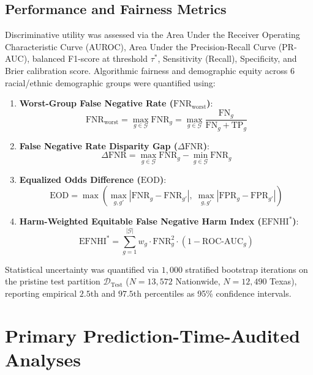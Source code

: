 \documentclass[10pt,journal]{IEEEtran}
\begin{document}
\subsection{Performance and Fairness Metrics}
Discriminative utility was assessed via the Area Under the Receiver Operating Characteristic Curve (AUROC), Area Under the Precision-Recall Curve (PR-AUC), balanced F1-score at threshold $\tau^*$, Sensitivity (Recall), Specificity, and Brier calibration score. Algorithmic fairness and demographic equity across 6 racial/ethnic demographic groups were quantified using:
\begin{enumerate}
    \item \textbf{Worst-Group False Negative Rate ($\text{FNR}_{\text{worst}}$)}:
    $$\text{FNR}_{\text{worst}} = \max_{g \in \mathcal{G}} \text{FNR}_g = \max_{g \in \mathcal{G}} \frac{\text{FN}_g}{\text{FN}_g + \text{TP}_g}$$
    \item \textbf{False Negative Rate Disparity Gap ($\Delta\text{FNR}$)}:
    $$\Delta\text{FNR} = \max_{g \in \mathcal{G}} \text{FNR}_g - \min_{g \in \mathcal{G}} \text{FNR}_g$$
    \item \textbf{Equalized Odds Difference ($\text{EOD}$)}:
    $$\text{EOD} = \max \left( \max_{g,g'} |\text{FNR}_g - \text{FNR}_{g'}|, \; \max_{g,g'} |\text{FPR}_g - \text{FPR}_{g'}| \right)$$
    \item \textbf{Harm-Weighted Equitable False Negative Harm Index ($\text{EFNHI}^*$)}:
    $$\text{EFNHI}^* = \sum_{g=1}^{|\mathcal{G}|} w_g \cdot \text{FNR}_g^2 \cdot (1 - \text{ROC-AUC}_g)$$
\end{enumerate}
Statistical uncertainty was quantified via $1{,}000$ stratified bootstrap iterations on the pristine test partition $\mathcal{D}_{\text{Test}}$ ($N=13{,}572$ Nationwide, $N=12{,}490$ Texas), reporting empirical $2.5\text{th}$ and $97.5\text{th}$ percentiles as 95\% confidence intervals.

\section{Primary Prediction-Time-Audited Analyses}
\end{document}
